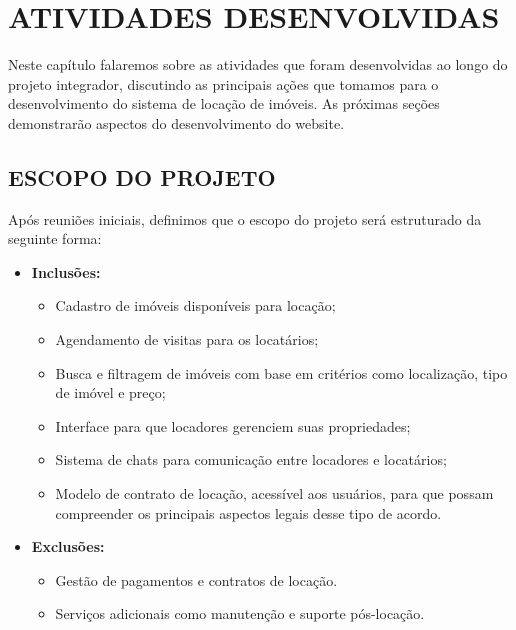 \chapter{ATIVIDADES DESENVOLVIDAS}

Neste capítulo falaremos sobre as atividades que foram desenvolvidas ao longo do projeto integrador, discutindo as principais ações que tomamos para o desenvolvimento do sistema de locação de imóveis. As próximas seções demonstrarão aspectos do desenvolvimento do website.









\section{ESCOPO DO PROJETO}
Após reuniões iniciais, definimos que o escopo do projeto será estruturado da seguinte forma:



\begin{itemize}
    \item \textbf{Inclusões:}
    \begin{itemize}
        \item Cadastro de imóveis disponíveis para locação;
        \item Agendamento de visitas para os locatários;
        \item Busca e filtragem de imóveis com base em critérios como localização, tipo de imóvel e preço;
        \item Interface para que locadores gerenciem suas propriedades;
        \item Sistema de chats para comunicação entre locadores e locatários;
        \item Modelo de contrato de locação, acessível aos usuários, para que possam compreender os principais aspectos legais desse tipo de acordo.
    \end{itemize}
    
    \item \textbf{Exclusões:}
    \begin{itemize}
        \item Gestão de pagamentos e contratos de locação.
        \item Serviços adicionais como manutenção e suporte pós-locação.
    \end{itemize}
\end{itemize}

